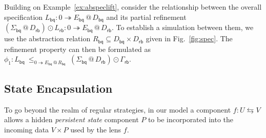 \documentclass[acmsmall,screen,review,nonacm]{acmart}
\newcommand{\kw}[1]{\ensuremath{ \mathsf{#1} }}
\newcommand{\emptysig}{0}
\begin{document}
\begin{example} \label{ex:bqcorrect} %
Building on Example~\ref{ex:abspeclift},
consider the relationship between
the overall specification $
  L_\kw{bq} :
    \emptysig \twoheadrightarrow E_\kw{bq} \mathbin@ D_\kw{bq}
$
and its partial refinement
$
  (\Sigma_\kw{bq} \mathbin@ D_\kw{rb}) \odot L_\kw{rb} :
    \emptysig \twoheadrightarrow E_\kw{bq} \mathbin@ D_\kw{rb}
$.
To establish a simulation between them,
we use the abstraction relation
$R_\kw{bq} \subseteq D_\kw{bq} \times D_\kw{rb}$
given in Fig.~\ref{fig:spec}.
The refinement property can then be formulated as
$
  \phi_1 :
  L_\kw{bq}
  \:\le_{\emptysig \twoheadrightarrow E_\kw{bq} \mathbin@ R_\kw{bq}}\:
  (\Sigma_\kw{bq} \mathbin@ D_\kw{rb}) \odot
  \Gamma_\kw{rb}
$.
\end{example}

\subsection{State Encapsulation}
\label{sec:state:encap}

To go beyond the realm of regular strategies,
in our model a component $f : U \leftrightarrows V$
allows a hidden \emph{persistent state} component $P$
to be incorporated into the incoming data $V \times P$
used by the lens $f$.
\end{document}
